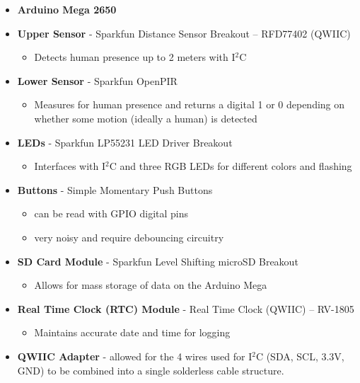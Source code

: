 \documentclass{article}
\begin{document}
\begin{itemize}
	\item \textbf{Arduino Mega 2650}
	\item \textbf{Upper Sensor} - Sparkfun Distance Sensor Breakout – RFD77402 (QWIIC)
	\begin{itemize}
		\item Detects human presence up to 2 meters with I$^2$C
	\end{itemize}
	\item \textbf{Lower Sensor} - Sparkfun OpenPIR
	\begin{itemize}
		\item Measures for human presence and returns a digital 1 or 0 depending on whether some motion (ideally a human) is detected
	\end{itemize}
	\item \textbf{LEDs} - Sparkfun LP55231 LED Driver Breakout
	\begin{itemize}
		\item Interfaces with I$^2$C and three RGB LEDs for different colors and flashing
	\end{itemize}
	\item \textbf{Buttons} - Simple Momentary Push Buttons
	\begin{itemize}
		\item can be read with GPIO digital pins
		\item very noisy and require debouncing circuitry
	\end{itemize}
	\item \textbf{SD Card Module} - Sparkfun Level Shifting microSD Breakout
	\begin{itemize}
		\item Allows for mass storage of data on the Arduino Mega
	\end{itemize}
	\item \textbf{Real Time Clock (RTC) Module} - Real Time Clock (QWIIC) – RV-1805
	\begin{itemize}
		\item Maintains accurate date and time for logging
	\end{itemize}
	\item \textbf{QWIIC Adapter} - allowed for the 4 wires used for I$^2$C (SDA, SCL, 3.3V, GND) to be combined into a single solderless cable structure.
	
\end{itemize}
\end{document}
